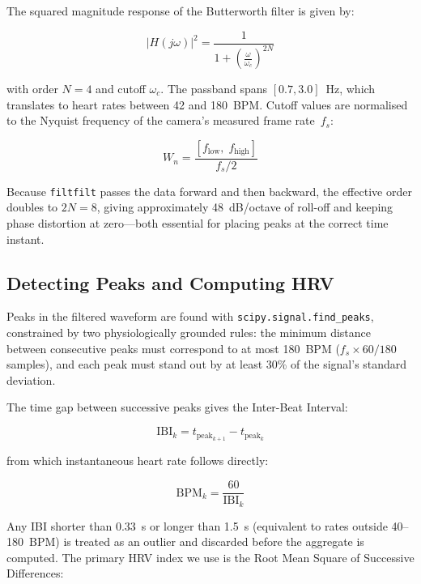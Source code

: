 \documentclass[conference]{IEEEtran}
\begin{document}
The squared magnitude response of the Butterworth filter is
given by:

\begin{equation}
\label{eq:butterworth}
|H(j\omega)|^{2} = \frac{1}{1 + \left(\frac{\omega}{\omega_c}\right)^{2N}}
\end{equation}

\noindent with order $N = 4$ and cutoff $\omega_c$. The passband
spans $[0.7, 3.0]$~Hz, which translates to heart rates between
42 and 180~BPM. Cutoff values are normalised to the Nyquist
frequency of the camera's measured frame rate~$f_s$:

\begin{equation}
\label{eq:nyquist}
W_n = \frac{[f_{\text{low}},\; f_{\text{high}}]}{f_s / 2}
\end{equation}

Because \texttt{filtfilt} passes the data forward and then backward,
the effective order doubles to $2N = 8$, giving approximately
48~dB/octave of roll-off and keeping phase distortion at zero---both
essential for placing peaks at the correct time instant.

\subsection{Detecting Peaks and Computing HRV}

Peaks in the filtered waveform are found with
\texttt{scipy.signal.find\_peaks}, constrained by two
physiologically grounded rules: the minimum distance between
consecutive peaks must correspond to at most 180~BPM ($f_s \times
60 / 180$ samples), and each peak must stand out by at least 30\%
of the signal's standard deviation.

The time gap between successive peaks gives the Inter-Beat
Interval:

\begin{equation}
\label{eq:ibi}
\text{IBI}_k = t_{\text{peak}_{k+1}} - t_{\text{peak}_k}
\end{equation}

\noindent from which instantaneous heart rate follows directly:

\begin{equation}
\label{eq:bpm}
\text{BPM}_k = \frac{60}{\text{IBI}_k}
\end{equation}

Any IBI shorter than 0.33~s or longer than 1.5~s (equivalent to
rates outside 40--180~BPM) is treated as an outlier and discarded
before the aggregate is computed. The primary HRV index we use is
the Root Mean Square of Successive Differences:
\end{document}
